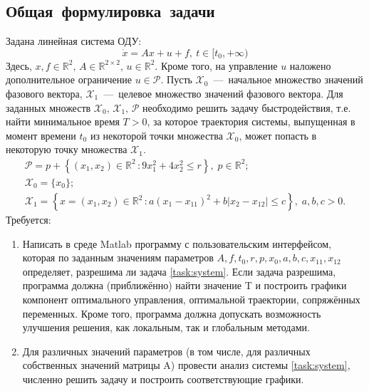 \documentclass[11pt, oneside, final]{article}
\theoremstyle{break}
\numberwithin{equation}{section}
\theoremstyle{plain}
\theoremstyle{definition}
\newcommand \real{\mathbb{R}}
\begin{document}
    \subsection{Общая~формулировка~задачи} 
    \label{sub:general}
    Задана линейная система ОДУ: 
    \begin{equation} 
        \label{task:system} 
        \dot x = Ax + u + f,\:t \in [t_0, +\infty)
    \end{equation}
    Здесь, \(x, f \in \real^2, \, A \in \real^{2\times2}, \, u \in \real^2 \).
     Кроме того, на управление \( u \) наложено дополнительное ограничение \(u \in \mathcal{P} \). Пусть \( \mathcal{X}_0 \)~---~начальное множество значений фазового вектора, \( \mathcal{X}_1 \)~---~целевое множество значений фазового вектора. Для заданных множеств \( \mathcal{X}_0 ,\, \mathcal{X}_1, \, \mathcal{P} \) необходимо решить задачу быстродействия, т.е. найти минимальное время \(T > 0 \), за которое траектория системы, выпущенная в момент времени \( t_0 \) из некоторой точки множества \( \mathcal{X}_0 \), может попасть в некоторую точку множества \( \mathcal{X}_1 \). 
    \begin{gather}
        \label{task:P} 
        \mathcal{P} = p + \left\{ (x_1, x_2) \in \real^2 \, \colon 9x_1^2 + 4x_2^2 \leqslant r \right\}, \; p \in \real ^2; \\
        \label{task:X0}
        \mathcal{X}_0 = \{x_0\}; \\
        \label{task:X1}
        \mathcal{X}_1 = \left\{ x = (x_1, x_2) \in \real^2 \, \colon a(x_1 - x_{11})^2 + b |x_2 - x_{12}| \leqslant c \right\}, \; a, b, c > 0.
    \end{gather} 
    Требуется: 
    \begin{enumerate} 
        \item Написать в среде Matlab программу с пользовательским интерфейсом, которая по заданным значениям параметров \(A, f, t_0, r, p, x_0, a, b, c, x_{11}, x_{12}\) определяет, разрешима ли задача \eqref{task:system}. Если задача разрешима, программа должна (приближённо) найти значение T и построить графики компонент оптимального управления, оптимальной траектории, сопряжённых переменных. Кроме того, программа должна допускать возможность улучшения решения, как локальным, так и глобальным методами.
        \item Для различных значений параметров (в том числе, для различных собственных значений матрицы A) провести анализ системы \eqref{task:system}, численно решить задачу и построить соответствующие графики.
    \end{enumerate}
    \pagebreak
\end{document}
